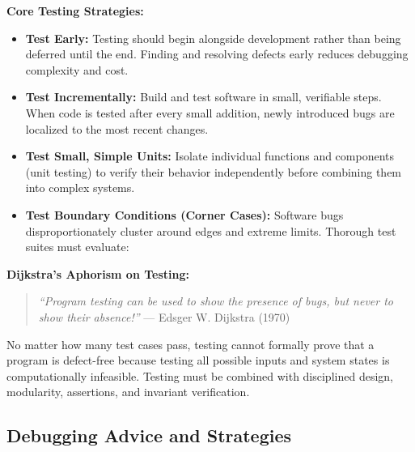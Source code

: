 \begin{definition}
    \textbf{Core Testing Strategies:}
    \begin{itemize}
        \item \textbf{Test Early:} Testing should begin alongside development rather than being deferred until the end. Finding and resolving defects early reduces debugging complexity and cost.
        \item \textbf{Test Incrementally:} Build and test software in small, verifiable steps. When code is tested after every small addition, newly introduced bugs are localized to the most recent changes.
        \item \textbf{Test Small, Simple Units:} Isolate individual functions and components (unit testing) to verify their behavior independently before combining them into complex systems.
        \item \textbf{Test Boundary Conditions (Corner Cases):} Software bugs disproportionately cluster around edges and extreme limits. Thorough test suites must evaluate:
    \end{itemize}
\end{definition}

\begin{remark}
    \textbf{Dijkstra's Aphorism on Testing:}
    \begin{quote}
        \emph{``Program testing can be used to show the presence of bugs, but never to show their absence!''}
        \hfill --- Edsger W. Dijkstra (1970)
    \end{quote}
    No matter how many test cases pass, testing cannot formally prove that a program is defect-free because testing all possible inputs and system states is computationally infeasible. Testing must be combined with disciplined design, modularity, assertions, and invariant verification.
\end{remark}

\subsection{Debugging Advice and Strategies}

